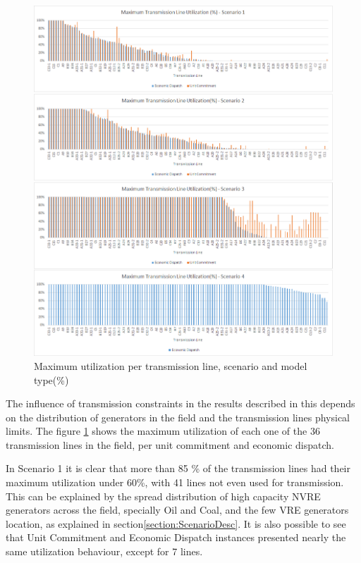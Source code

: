 \documentclass[12pt,LUDisStyle,twosided]{book}
\begin{document}
\begin{figure}[H] 
  \centering
  
	  \includegraphics[width=\textwidth,height=\textheight,keepaspectratio]{MaximumTransmissionLineUtilization.png}
  
  \caption{Maximum utilization per transmission line, scenario and model type(\%)}
  \label{fig:maximumutilizaton}
\end{figure}

The influence of transmission constraints in the results described in this depends on the distribution of generators in the field and the transmission lines physical limits. The figure \ref{fig:maximumutilizaton} shows the maximum utilization of each one of the 36 transmission lines in the field, per unit commitment and economic dispatch. 

In Scenario 1 it is clear that more than 85 \% of the transmission lines had their maximum utilization under 60\%, with 41 lines not even used for transmission.  This can be explained by the spread distribution of high capacity NVRE generators across the field, specially Oil and Coal, and the few VRE generators location, as explained in section\ref{section:ScenarioDesc}. It is also possible to see that Unit Commitment and Economic Dispatch instances presented nearly the same utilization behaviour, except for 7 lines. 
\end{document}
